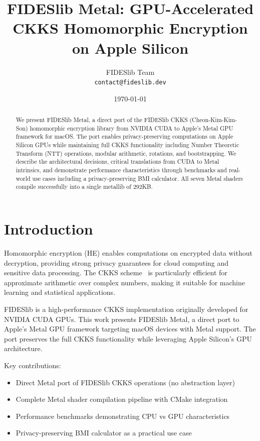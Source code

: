 \documentclass[11pt,oneside]{article}
\title{
FIDESlib Metal: GPU-Accelerated CKKS Homomorphic Encryption \\
on Apple Silicon
}
\author{
    FIDESlib Team \\
    \texttt{contact@fideslib.dev}
}
\date{\today}
\begin{document}
\maketitle

\begin{abstract}
We present FIDESlib Metal, a direct port of the FIDESlib CKKS (Cheon-Kim-Kim-Son) homomorphic encryption library from NVIDIA CUDA to Apple's Metal GPU framework for macOS. The port enables privacy-preserving computations on Apple Silicon GPUs while maintaining full CKKS functionality including Number Theoretic Transform (NTT) operations, modular arithmetic, rotations, and bootstrapping. We describe the architectural decisions, critical translations from CUDA to Metal intrinsics, and demonstrate performance characteristics through benchmarks and real-world use cases including a privacy-preserving BMI calculator. All seven Metal shaders compile successfully into a single metallib of 292KB.
\end{abstract}

\section{Introduction}

Homomorphic encryption (HE) enables computations on encrypted data without decryption, providing strong privacy guarantees for cloud computing and sensitive data processing. The CKKS scheme~\cite{cheon2017full} is particularly efficient for approximate arithmetic over complex numbers, making it suitable for machine learning and statistical applications.

FIDESlib is a high-performance CKKS implementation originally developed for NVIDIA CUDA GPUs. This work presents FIDESlib Metal, a direct port to Apple's Metal GPU framework targeting macOS devices with Metal support. The port preserves the full CKKS functionality while leveraging Apple Silicon's GPU architecture.

Key contributions:
\begin{itemize}
    \item Direct Metal port of FIDESlib CKKS operations (no abstraction layer)
    \item Complete Metal shader compilation pipeline with CMake integration
    \item Performance benchmarks demonstrating CPU vs GPU characteristics
    \item Privacy-preserving BMI calculator as a practical use case
\end{itemize}
\end{document}
